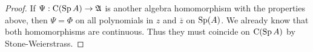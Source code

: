 \begin{proof}
 If $\Psi : \operatorname{C} ( \operatorname{Sp} A) \to \mathfrak{A}$ is another algebra homomorphism with the 
 properties above, then $\Psi = \Phi$ on all polynomials in $z$ and 
 $\overline{z}$ on $\operatorname{Sp} (A)$. We already know that both homomorphisms are
 continuous. Thus  they must coincide on $\operatorname{C} ( \operatorname{Sp} A )$ by Stone-Weierstrass.
\end{proof}





